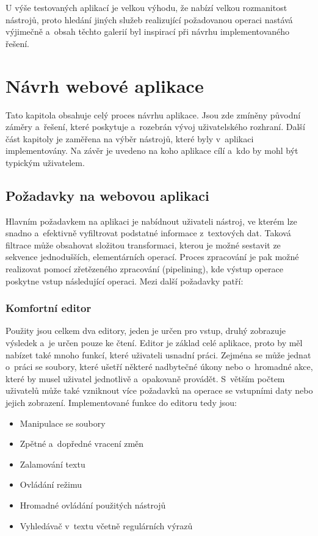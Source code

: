 U výše testovaných aplikací je velkou výhodu, že nabízí velkou rozmanitost nástrojů, proto hledání jiných služeb realizující požadovanou operaci nastává výjimečně a~obsah těchto galerií byl inspirací při návrhu implementovaného řešení.

\chapter{Návrh webové aplikace}
\label{chap:Návrh webové aplikace}

Tato kapitola obsahuje celý proces návrhu aplikace. Jsou zde zmíněny původní záměry a~řešení, které poskytuje a~rozebrán vývoj uživatelského rozhraní. Další část kapitoly je zaměřena na výběr nástrojů, které byly v~aplikaci implementovány. Na závěr je uvedeno na koho aplikace cílí a~kdo by mohl být typickým uživatelem.

\section{Požadavky na webovou aplikaci}
\label{sec:Požadavky na webovou aplikaci}
Hlavním požadavkem na aplikaci je nabídnout uživateli nástroj, ve kterém lze snadno a~efektivně vyfiltrovat podstatné informace z~textových dat. Taková filtrace může obsahovat složitou transformaci, kterou je možné sestavit ze sekvence jednodušších, elementárních operací. Proces zpracování je pak možné realizovat pomocí zřetězeného zpracování (pipelining), kde výstup operace poskytne vstup následující operaci. Mezi další požadavky patří:

\subsection*{Komfortní editor}
Použity jsou celkem dva editory, jeden je určen pro vstup, druhý zobrazuje výsledek a~je určen pouze ke čtení. Editor je základ celé aplikace, proto by měl nabízet také mnoho funkcí, které uživateli usnadní práci. Zejména se může jednat o~práci se soubory, které ušetří některé nadbytečné úkony nebo o~hromadné akce, které by musel uživatel jednotlivě a~opakovaně provádět. S~větším počtem uživatelů může také vzniknout více požadavků na operace se vstupními daty nebo jejich zobrazení. Implementované funkce do editoru tedy jsou:
\begin{itemize}
    \item Manipulace se soubory
    \item Zpětné a~dopředné vracení změn
    \item Zalamování textu
    \item Ovládání režimu
    \item Hromadné ovládání použitých nástrojů
    \item Vyhledávač v~textu včetně regulárních výrazů
\end{itemize}


